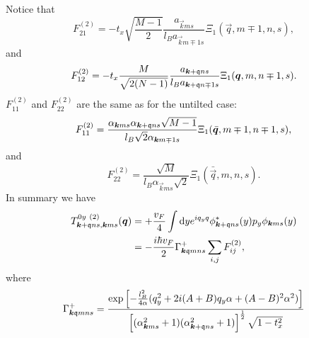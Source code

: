 Notice that
\begin{equation}
  \label{eq:55}
  F^{(2)}_{21}
  =
  -t_{x} \sqrt{\frac{M-1}{2}} \frac{a_{\vec{k} m s}}{l_B a_{\vec{k} m \mp 1 s}}
  \Xi_{1} (\vec{q}, m \mp 1, n, s),
\end{equation}
and
\begin{equation}
  F^{(2)}_{12}
  = -t_{x} \frac{M}{\sqrt{2 (N-1)} } \frac{a_{\bm{k} + \mathfrak{q} n s}}{l_B a_{\bm{k} + \mathfrak{q} n \mp 1 s}}
  \Xi_{1}(\bm{q}, m, n\mp1, s).
\end{equation}
\( F^{(2)}_{11} \) and \( F^{(2)}_{22} \) are the same as for the untilted case:
\begin{equation}
  \label{eq:56}
  F^{(2)}_{11} = \frac{\alpha_{\bm{k} m s} \alpha_{\bm{k} + \mathfrak{q} ns} \sqrt{M-1} }{ l_B \sqrt{2} \alpha _{\bm{k} m\mp 1 s}}
  \Xi_{1} (\bar{\bm{q}}, m\mp 1, n\mp 1, s),
\end{equation}
and
\begin{equation}
  \label{eq:57}
  F^{(2)}_{22} =
  \frac{\sqrt{M} }{l_B \alpha _{\vec{k} m s} \sqrt{2} }
  \Xi_{1} ( \bar{\vec{q}}, m, n, s ).
\end{equation}
In summary we have
\begin{align}
  \label{eq:58}
  T^{0y~(2)}_{\bm{k} + \mathfrak{q} ns, \bm{k} ms} (\bm{q}) &= + \frac{v_F}{4} \int \mathrm{d} y
  e^{i q_y q} \phi _{\bm{k} + \mathfrak{q} ns}^{*} (y) p_{y} \phi _{\bm{k} ms} (y)\\
&= -\frac{ i \hbar v_{F} }{2}
                                                                                     \Gamma _{\bm{k} \mathfrak{q} m n s}^+
\sum\limits_{i,j}^{} F^{(2)}_{ij},
\end{align}
where
\[
  \Gamma _{\bm{k} \mathfrak{q} m n s}^+ =
  \frac{
  \exp
  \left[
    - \frac{l_{B}^2}{4 \alpha } (q_{y}^2 + 2 i (A+B) q_{y} \alpha + (A-B)^2\alpha^2)
  \right  ]
}{
  \left[(\alpha_{\bm{k} m s}^2 +1) (\alpha_{\bm{k} + \mathfrak{q} ns} ^2 + 1)\right]^{\frac{1}{2}}
  \sqrt{1 - t_x^2 }}
\]

